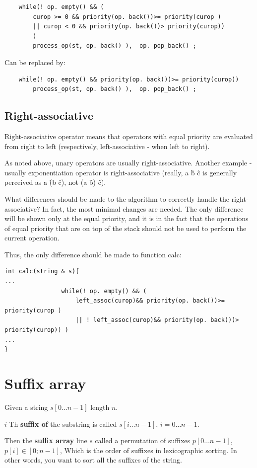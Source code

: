 \begin{verbatim}
    while(! op. empty() && (
        curop >= 0 && priority(op. back())>= priority(curop )
        || curop < 0 && priority(op. back())> priority(curop))
        )
        process_op(st, op. back() ),  op. pop_back() ; 
\end{verbatim}
Can be replaced by:

\begin{verbatim}
    while(! op. empty() && priority(op. back())>= priority(curop))
        process_op(st, op. back() ),  op. pop_back() ; 
\end{verbatim}
\subsection{ Right-associative }

Right-associative operator means that operators with equal priority are evaluated from right to left (respectively, left-associative - when left to right).

As noted above, unary operators are usually right-associative. Another example - usually exponentiation operator is right-associative (really, a \^ b \^ c is generally perceived as a \^ (b \^ c), not (a \^ b) \^ c).

What differences should be made to the algorithm to correctly handle the right-associative? In fact, the most minimal changes are needed. The only difference will be shown only at the equal priority, and it is in the fact that the operations of equal priority that are on top of the stack should not be used to perform the current operation.

Thus, the only difference should be made to function calc:

\begin{verbatim}
int calc(string & s){
...
                while(! op. empty() && (
                    left_assoc(curop)&& priority(op. back())>= priority(curop )
                    || ! left_assoc(curop)&& priority(op. back())> priority(curop)) )
...
} 
\end{verbatim}
\section{ Suffix array }
Given a string $s [0 \ldots n-1]$ length $n$.

$i$ Th \textbf{suffix of} the substring is called $s [i \ldots n-1]$, $i = 0 \ldots n-1$.

Then the \textbf{suffix array} line $s$ called a permutation of suffixes $p [0 \ldots n-1]$, $p [i] \in [0; n-1]$, Which is the order of suffixes in lexicographic sorting. In other words, you want to sort all the suffixes of the string.

